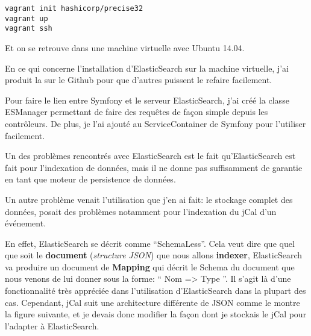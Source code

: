 \begin{lstlisting}
vagrant init hashicorp/precise32
vagrant up
vagrant ssh
\end{lstlisting}

Et on se retrouve dans une machine virtuelle avec Ubuntu 14.04.

En ce qui concerne l'installation d'ElasticSearch sur la machine virtuelle, j'ai produit la  sur le Github pour que d'autres puissent le refaire facilement.

Pour faire le lien entre Symfony et le serveur ElasticSearch, j'ai créé la classe ESManager permettant de faire des requêtes de façon simple depuis les contrôleurs. De plus, je l'ai ajouté au ServiceContainer de Symfony pour l'utiliser facilement.

Un des problèmes rencontrés avec ElasticSearch est le fait qu'ElasticSearch est fait pour l'indexation de données, mais il ne donne pas suffisamment de garantie en tant que moteur de persistence de données.

Un autre problème venait l'utilisation que j'en ai fait: le stockage complet des données, posait des problèmes notamment pour l'indexation du jCal d'un événement.

En effet, ElasticSearch se décrit comme ``SchemaLess''. Cela veut dire que quel que soit le \textbf{document} (\textit{structure JSON}) que nous allons \textbf{indexer}, ElasticSearch va produire un document de \textbf{Mapping} qui décrit le Schema du document que nous venons de lui donner sous la forme: `` Nom => Type ''. Il s'agit là d'une fonctionnalité très appréciée dans l'utilisation d'ElasticSearch dans la plupart des cas. Cependant, jCal suit une architecture différente de JSON comme le montre la figure suivante, et je devais donc modifier la façon dont je stockais le jCal pour l'adapter à ElasticSearch.

